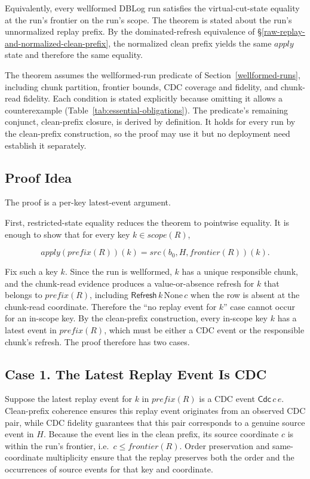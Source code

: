 \documentclass[letterpaper,10pt,twocolumn]{article}
\newcommand{\Apply}{\mathit{apply}}
\newcommand{\Src}{\mathit{src}}
\newcommand{\Scope}{\mathit{scope}}
\newcommand{\Frontier}{\mathit{frontier}}
\newcommand{\CleanPrefix}{\mathit{prefix}}
\newcommand{\None}{\mathrm{None}}
\begin{document}
Equivalently, every wellformed DBLog run satisfies the virtual-cut-state
equality at the run's frontier on the run's scope. The theorem is stated
about the run's unnormalized replay prefix. By the dominated-refresh equivalence
of \S\ref{raw-replay-and-normalized-clean-prefix}, the normalized clean
prefix yields the same $\Apply$ state and therefore the same equality.

The theorem assumes the wellformed-run predicate of
Section~\ref{wellformed-runs}, including chunk partition, frontier
bounds, CDC coverage and fidelity, and chunk-read fidelity. Each
condition is stated explicitly because omitting it allows a counterexample
(Table~\ref{tab:essential-obligations}). The predicate's remaining
conjunct, clean-prefix closure, is derived by definition. It holds
for every run by the clean-prefix construction, so the proof may use it
but no deployment need establish it separately.

\subsection{Proof Idea}\label{proof-idea}

The proof is a per-key latest-event argument.

First, restricted-state equality reduces the theorem to pointwise
equality. It is enough to show that for every key $k \in \Scope(R)$,

\[
  \Apply(\CleanPrefix(R))(k) = \Src(b_0,H,\Frontier(R))(k).
\]

Fix such a key $k$. Since the run is wellformed, $k$ has a
unique responsible chunk, and the chunk-read evidence produces a
value-or-absence refresh for $k$ that belongs to $\CleanPrefix(R)$,
including $\mathsf{Refresh}\,k\,\None\,c$ when the row is absent at the
chunk-read coordinate. Therefore the ``no replay event for $k$'' case
cannot occur for an in-scope key. By the clean-prefix construction,
every in-scope key $k$ has a latest event in $\CleanPrefix(R)$, which
must be either a CDC event or the responsible chunk's refresh. The proof
therefore has two cases.

\subsection{Case 1. The Latest Replay Event Is
CDC}\label{case-1-the-latest-replay-event-is-cdc}

Suppose the latest replay event for $k$ in
$\CleanPrefix(R)$ is a CDC event $\mathsf{Cdc}\,c\,e$. Clean-prefix
coherence ensures this replay event originates from an observed CDC pair,
while CDC fidelity guarantees that this pair corresponds to a genuine source
event in $H$. Because the event lies in the clean prefix, its
source coordinate $c$ is within the run's frontier, i.e.\ $c \le
\Frontier(R)$. Order preservation and same-coordinate
multiplicity ensure that the replay preserves both the order and the
occurrences of source events for that key and coordinate.
\end{document}
